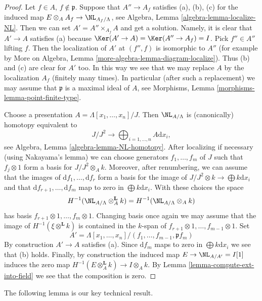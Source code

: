 \begin{proof}
Let $f \in A$, $f \not \in \mathfrak p$. Suppose that $A'' \to A_f$
satisfies (a), (b), (c) for the induced map
$E \otimes_A A_f \to \NL_{A_f/\Lambda}$, see
Algebra, Lemma \ref{algebra-lemma-localize-NL}.
Then we can set $A' = A'' \times_{A_f} A$ and get a solution.
Namely, it is clear that $A' \to A$ satisfies (a) because
$\Ker(A' \to A) = \Ker(A'' \to A_f) = I$. Pick
$f'' \in A''$ lifting $f$. Then the localization of $A'$ at
$(f'', f)$ is isomorphic to $A''$
(for example by
More on Algebra, Lemma \ref{more-algebra-lemma-diagram-localize}).
Thus (b) and (c) are clear for $A'$ too.
In this way we see that we may replace $A$ by the localization
$A_f$ (finitely many times).
In particular (after such a replacement) we may assume that $\mathfrak p$
is a maximal ideal of $A$, see
Morphisms, Lemma \ref{morphisms-lemma-point-finite-type}.

\medskip\noindent
Choose a presentation $A = \Lambda[x_1, \ldots, x_n]/J$. Then
$\NL_{A/\Lambda}$ is (canonically) homotopy equivalent to
$$
J/J^2
\longrightarrow
\bigoplus\nolimits_{i = 1, \ldots, n} A\text{d}x_i,
$$
see Algebra, Lemma \ref{algebra-lemma-NL-homotopy}. After localizing
if necessary (using Nakayama's lemma) we can choose generators
$f_1, \ldots, f_m$ of $J$ such that $f_j \otimes 1$ form a basis for
$J/J^2 \otimes_A k$. Moreover, after renumbering, we can assume that the
images of $\text{d}f_1, \ldots, \text{d}f_r$ form a
basis for the image of $J/J^2 \otimes k \to \bigoplus k\text{d}x_i$
and that $\text{d}f_{r + 1}, \ldots, \text{d}f_m$ map to zero in
$\bigoplus k\text{d}x_i$. With these choices the space
$$
H^{-1}(\NL_{A/\Lambda} \otimes^{\mathbf{L}}_A k) =
H^{-1}(\NL_{A/\Lambda} \otimes_A k)
$$
has basis $f_{r + 1} \otimes 1, \ldots, f_m \otimes 1$. Changing basis
once again we may assume that the image of $H^{-1}(\xi \otimes^{\mathbf{L}} k)$
is contained in the $k$-span of
$f_{r + 1} \otimes 1, \ldots, f_{m - 1} \otimes 1$.
Set
$$
A' = \Lambda[x_1, \ldots, x_n]/(f_1, \ldots, f_{m - 1}, \mathfrak pf_m)
$$
By construction $A' \to A$ satisfies (a). Since $\text{d}f_m$ maps
to zero in $\bigoplus k\text{d}x_i$ we see that (b) holds. Finally, by
construction the induced map $E \to \NL_{A/A'} = I[1]$ induces the zero map
$H^{-1}(E \otimes_A^\mathbf{L} k) \to I \otimes_A k$. By
Lemma \ref{lemma-compute-ext-into-field}
we see that the composition is zero.
\end{proof}

\noindent
The following lemma is our key technical result.

